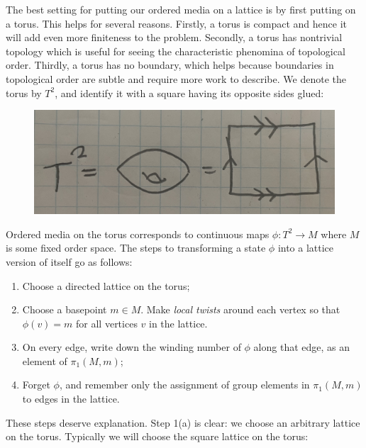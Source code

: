 \documentclass{article}
\theoremstyle{definition}
\newcommand{\0}{\left|0\right>}
\newcommand{\1}{\left|1\right>}
\numberwithin{figure}{section}
\begin{document}
The best setting for putting our ordered media on a lattice is by first putting on a torus. This helps for several reasons. Firstly, a torus is compact and hence it will add even more finiteness to the problem. Secondly, a torus has nontrivial topology which is useful for seeing the characteristic phenomina of topological order. Thirdly, a torus has no boundary, which helps because boundaries in topological order are subtle and require more work to describe. We denote the torus by $T^2$, and identify it with a square having its opposite sides glued:

\begin{figure}[h]
\begin{center}
\includegraphics[scale=.04]{torus-definition}
\end{center}
\end{figure}

Ordered media on the torus corresponds to continuous maps $\phi: T^2\to M$ where $M$ is some fixed order space. The steps to transforming a state $\phi$ into a lattice version of itself go as follows:

\begin{enumerate}
\item Choose a directed lattice on the torus;
\item Choose a basepoint $m\in M$. Make \textit{local twists} around each vertex so that $\phi(v)=m$ for all vertices $v$ in the lattice.
\item On every edge, write down the winding number of $\phi$ along that edge, as an element of $\pi_1(M,m)$;
\item Forget $\phi$, and remember only the assignment of group elements in $\pi_1(M,m)$ to edges in the lattice.
\end{enumerate}

These steps deserve explanation. Step 1(a) is clear: we choose an arbitrary lattice on the torus. Typically we will choose the square lattice on the torus:
\end{document}
